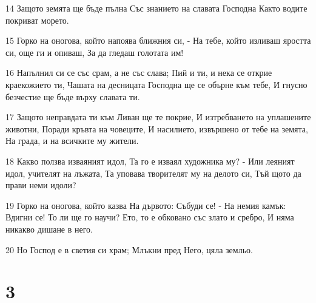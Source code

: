 \par 14 Защото земята ще бъде пълна Със знанието на славата Господна Както водите покриват морето.
\par 15 Горко на оногова, който напоява ближния си, - На тебе, който изливаш яростта си, още ги и опиваш, За да гледаш голотата им!
\par 16 Напълнил си се със срам, а не със слава; Пий и ти, и нека се открие краекожието ти, Чашата на десницата Господна ще се обърне към тебе, И гнусно безчестие ще бъде върху славата ти.
\par 17 Защото неправдата ти към Ливан ще те покрие, И изтребването на уплашените животни, Поради кръвта на човеците, И насилието, извършено от тебе  на земята, На града, и на всичките му жители.
\par 18 Какво ползва изваяният идол, Та го е изваял художника му? - Или леяният идол, учителят на лъжата, Та уповава творителят му на делото си, Тъй щото да прави неми идоли?
\par 19 Горко на оногова, който казва На дървото: Събуди се! - На немия камък: Вдигни се! То ли ще го научи? Ето, то е обковано със злато и сребро, И няма никакво дишане в него.
\par 20 Но Господ е в светия си храм; Млъкни пред Него, цяла земльо.

\chapter{3}

